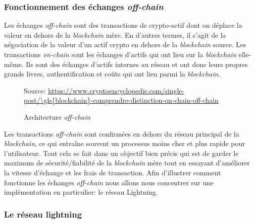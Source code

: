 \subsubsection{Fonctionnement des échanges \textit{off-chain}}
Les échanges \textit{off-chain} sont des transactions de crypto-\gls{actif} dont on déplace la valeur en dehors de la \textit{\gls{blockchain}} mère. En d’autres termes, il s’agit de la négociation de la valeur d’un \gls{actif} crypto en dehors de la \textit{\gls{blockchain}} source. Les transactions \textit{on-chain} sont les échanges d'\gls{actif}s qui ont lieu sur la \textit{\gls{blockchain}} elle-même.
Ils sont des échanges d’\gls{actif}s internes au réseau et ont donc leurs propres grands livres, authentification et coûts qui ont lieu parmi la \textit{\gls{blockchain}}.
\begin{figure}[h!]
    \centering
    {\scriptsize Source: \url{https://www.cryptoencyclopedie.com/single-post/\gls{blockchain}-comprendre-distinction-on-chain-off-chain}}
    \caption{Architecture \textit{off-chain}}
    \label{fig:offchain}
\end{figure}
Les transactions \textit{off-chain} sont confirmées en dehors du réseau principal de la \textit{\gls{blockchain}}, ce qui entraîne souvent un processus moins cher et plus rapide pour l’utilisateur. 
Tout cela se fait dans un objectif bien précis qui est de garder le maximum de sécurité/fiabilité de la \textit{\gls{blockchain}} mère tout en essayant d'améliorer la vitesse d'échange et les frais de transaction.
Afin d'illustrer comment fonctionne les échanges \textit{off-chain} nous allons nous concentrer sur une implémentation en particulier: le réseau Lightning. 

\subsubsection{Le réseau lightning}

